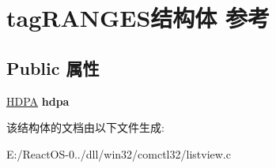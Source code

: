 \hypertarget{structtag_r_a_n_g_e_s}{}\section{tag\+R\+A\+N\+G\+E\+S结构体 参考}
\label{structtag_r_a_n_g_e_s}
\subsection*{Public 属性}
\begin{DoxyCompactItemize}
\item 
\mbox{\label{structtag_r_a_n_g_e_s_ab48d46292e2c0564de2ad1857d5000d7}} 
\hyperlink{struct___d_p_a}{H\+D\+PA} {\bfseries hdpa}
\end{DoxyCompactItemize}


该结构体的文档由以下文件生成\+:\begin{DoxyCompactItemize}
\item 
E\+:/\+React\+O\+S-\/0../dll/win32/comctl32/listview.\+c\end{DoxyCompactItemize}
